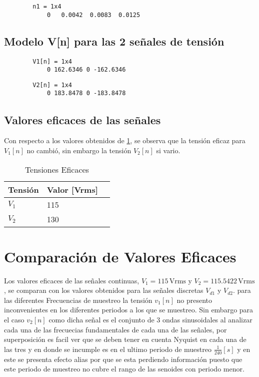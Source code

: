 \documentclass[conference]{IEEEtran}
\theoremstyle{mytheoremstyle}
\theoremstyle{mytheoremstyle}
\theoremstyle{myproblemstyle}
\begin{document}
        \begin{verbatim}
        n1 = 1x4 
            0	0.0042	0.0083	0.0125
        \end{verbatim}
        
        
        \subsection{Modelo V[n] para las 2 señales de tensión}
        
        \begin{verbatim}
        V1[n] = 1x4    
            0 162.6346 0 -162.6346
        \end{verbatim}
        
        
        \begin{verbatim}
        V2[n] = 1x4   
            0 183.8478 0 -183.8478
        \end{verbatim}
        
            \subsection{Valores eficaces de las señales}
            Con respecto a los valores obtenidos de \ref{tab:tensiones2}, se observa que la tensión eficaz para $V_1[n]$ no cambió, sin embargo la tensión $V_2[n]$ si vario.   
            \begin{table}[h]
            \centering
            \caption{Tensiones Eficaces}
            \begin{tabular}{@{}lll@{}}
                \toprule
                Tensión & Valor [Vrms] \\ \midrule
                $V_1$   & 115     \\
                $V_2$   & 130     \\ \bottomrule
            \end{tabular}
            \label{tab:tensiones2}
            \end{table}
        
                        
            \section*{Comparación de Valores Eficaces}
            Los valores eficaces de las señales continuas, \( V_1 = 115 \, \text{Vrms} \) y \( V_2 = 115.5422 \, \text{Vrms} \), se comparan con los valores obtenidos para las señales discretas \( V_{d1} \) y \( V_{d2} \). para las diferentes Frecuencias de muestreo la tensión $v_1[n]$ no presento inconvenientes en los diferentes periodos a los que se muestreo. Sin embargo para el caso $v_2[n]$ como dicha señal es el conjunto de 3 ondas sinusoidales al analizar cada una de las frecuecias fundamentales de cada una de las señales, por superposición es facil ver que se deben tener en cuenta Nyquist en cada una de las tres y en donde se incumple es en el ultimo periodo de muestreo $\frac{1}{240} [s]$ y en este se presenta efecto alias por que se esta perdiendo información puesto que este periodo de muestreo no cubre el rango de las senoides con periodo menor.
\end{document}
